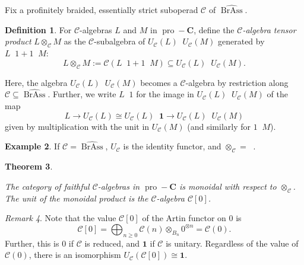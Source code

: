 \documentclass[12pt]{article}
\DeclareMathOperator{\pro}{pro}
\DeclareMathOperator{\BrAss}{BrAss}
\DeclareMathOperator{\hattimes}{\widehat{\otimes}}
\newcommand{\BrAsshat}{\widehat{\BrAss}} %
\newcommand{\CC} {\mathcal{C}}
\newcommand{\bC} {\mathbf{C}}
\newcommand{\one} {\mathbf{1}}
\newcommand{\proC}{\pro\!-\bC}
\theoremstyle{plain}
\newtheorem{thm}{Theorem}[section]
\theoremstyle{definition}
\newtheorem{defn}[thm]{Definition}
\newtheorem{exmp}[thm]{Example}
\theoremstyle{remark}
\newtheorem{rem}[thm]{Remark}
\begin{document}
Fix a profinitely braided, essentially strict suboperad $\CC$ of $\BrAsshat$.  

\begin{defn}

For $\CC$-algebras $L$ and $M$ in $\proC$, define the \emph{$\CC$-algebra tensor product} $L \otimes_{\CC} M$ as the $\CC$-subalgebra of $U_{\CC}(L) \hattimes U_{\CC}(M)$ generated by $L \hattimes 1 + 1 \hattimes M$:
%
$$L \otimes_{\CC} M := \CC(L \hattimes 1 + 1 \hattimes M) \subseteq U_{\CC}(L) \hattimes U_{\CC}(M).$$

\end{defn} 

Here, the algebra $U_{\CC}(L) \hattimes U_{\CC}(M)$ becomes a $\CC$-algebra by restriction along $\CC \subseteq \BrAsshat$.  Further, we write $L \hattimes 1$ for the image in $U_{\CC}(L) \hattimes U_{\CC}(M)$ of the map
%
$$L \to U_{\CC}(L) \cong U_{\CC}(L) \hattimes \one \to U_{\CC}(L) \hattimes U_{\CC}(M)$$
%
given by multiplication with the unit in $U_{\CC}(M)$ (and similarly for $1 \hattimes M$).

\begin{exmp} If $\CC = \BrAsshat$, $U_{\CC}$ is the identity functor, and $\otimes_{\CC} = \hattimes$. \end{exmp}

\begin{thm} \label{hopf_cat_thm}

The category of faithful $\CC$-algebras in $\proC$ is monoidal with respect to $\otimes_{\CC}$.  The unit of the monoidal product is the $\CC$-algebra $\CC[0]$.

\end{thm}

\begin{rem} Note that the value $\CC[0]$ of the Artin functor on $0$ is 
%
$$\CC[0] = \bigoplus_{n \geq 0} \CC(n) \otimes_{B_n} 0^{\otimes n} = \CC(0).$$
%
Further, this is $0$ if $\CC$ is reduced, and $\one$ if $\CC$ is unitary.  Regardless of the value of $\CC(0)$, there is an isomorphism $U_{\CC}(\CC[0]) \cong \one$.

\end{rem} 
\end{document}
